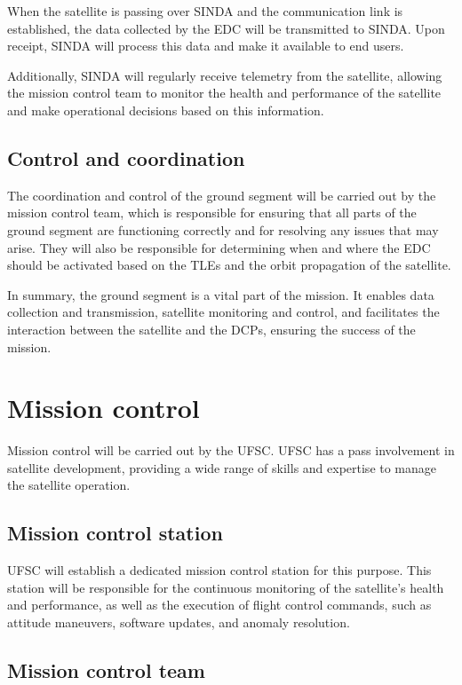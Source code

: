 When the satellite is passing over SINDA and the communication link is established, the data collected by the EDC will be transmitted to SINDA. Upon receipt, SINDA will process this data and make it available to end users.

Additionally, SINDA will regularly receive telemetry from the satellite, allowing the mission control team to monitor the health and performance of the satellite and make operational decisions based on this information.

\subsection{Control and coordination}

The coordination and control of the ground segment will be carried out by the mission control team, which is responsible for ensuring that all parts of the ground segment are functioning correctly and for resolving any issues that may arise. They will also be responsible for determining when and where the EDC should be activated based on the TLEs and the orbit propagation of the satellite.

In summary, the ground segment is a vital part of the mission. It enables data collection and transmission, satellite monitoring and control, and facilitates the interaction between the satellite and the DCPs, ensuring the success of the mission.

\section{Mission control}

Mission control will be carried out by the UFSC. UFSC has a pass involvement in satellite development, providing a wide range of skills and expertise to manage the satellite operation.

\subsection{Mission control station}

UFSC will establish a dedicated mission control station for this purpose. This station will be responsible for the continuous monitoring of the satellite's health and performance, as well as the execution of flight control commands, such as attitude maneuvers, software updates, and anomaly resolution.

\subsection{Mission control team}

